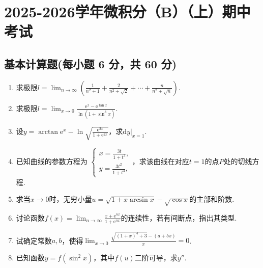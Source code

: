 \documentclass[../Main.tex]{subfiles}
\begin{document}
\chapter{2025-2026学年微积分（B）（上）期中考试}

\section{基本计算题(每小题 6 分，共 60 分)}
\begin{enumerate}
    \item 求极限$l=\lim_{n\to\infty}\left(\frac{1}{n^{2}+1}+\frac{2}{n^{2}+\sqrt{2}}
              +\cdots+\frac{n}{n^{2}+\sqrt{n}}\right).$
          \vspace{10em}

    \item 求极限$l=\lim_{x\to0}\frac{\mathrm{e}^{x}-\mathrm{e}^{\tan x}}{\ln(1+\sin^{3}
                  x)}.$
          \vspace{10em}

    \item 设$y=\arctan \mathrm{e}^{x}-\ln\sqrt{\frac{\mathrm{e}^{2x}}{1+\mathrm{e}^{2x}}}$，求$\mathrm{d}
              y\big |_{x=1}$.
          \vspace{10em}

    \item 已知曲线的参数方程为 $\begin{cases}
                  x=\frac{3t}{1+t^{3}}, \\
                  y=\frac{3t^{2}}{1+t^{3}},
              \end{cases}$，求该曲线在对应$t=1$的点$P$处的切线方程.
          \vspace{10em}

    \item 求当$x\to0$时，无穷小量$u=\sqrt{1+x\arcsin x}-\sqrt{\cos x}$的主部和阶数.
          \vspace{10em}

    \item 讨论函数$f(x)=\lim_{n\to\infty}\frac{x+\mathrm{e}^{nx}}{1+\mathrm{e}^{nx}}$的连续性，若有间断点，指出其类型.
          \vspace{10em}

    \item 试确定常数$a,b$，使得$\lim_{x\to0}\frac{\sqrt{(1+x)^4+3}-(a+bx)}{x}=0$.
          \vspace{10em}

    \item 已知函数$y=f(\sin^{2} x)$，其中$f(u)$二阶可导，求$y''$.
          \vspace{10em}


\end{enumerate}
\end{document}
